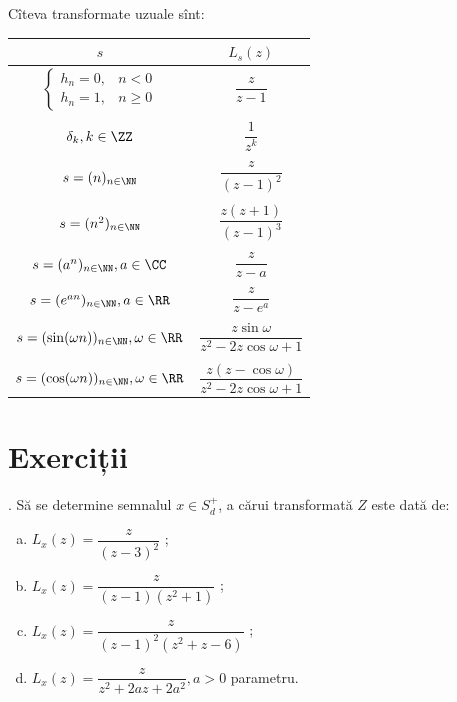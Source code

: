 Cîteva transformate uzuale sînt:
\begin{tabular}{c | c}
    $ s $ & $ L_s(z) $ \\
    \hline\hline
    $ \begin{cases}
        h_n = 0, & n < 0 \\
        h_n = 1, & n \geq 0
    \end{cases} $ & $ \dfrac{z}{z - 1} $ \\
          & \\
    $ \delta_k, k \in \ZZ $ & $ \dfrac{1}{z^k} $ \\
                            &\\
    $ s = (n)_{n \in \NN} $ & $ \dfrac{z}{(z - 1)^2} $ \\
                            &\\
    $ s = (n^2)_{n \in \NN} $ & $ \dfrac{z(z+1)}{(z - 1)^3} $ \\
                              &\\
    $ s = (a^n)_{n \in \NN}, a \in \CC $ & $ \dfrac{z}{z - a} $ \\
                                         &\\
    $ s = (e^{an})_{n \in \NN}, a \in \RR $ & $ \dfrac{z}{z - e^a} $ \\
                                            &\\
    $ s = (\sin(\omega n))_{n \in \NN}, \omega \in \RR $ & $ \dfrac{z \sin \omega}{z^2 - 2z \cos \omega + 1} $ \\
                                                         &\\
    $ s = (\cos(\omega n))_{n \in \NN}, \omega \in \RR $ & $ \dfrac{z(z - \cos \omega)}{z^2 - 2z \cos \omega + 1} $
\end{tabular}


\section{Exerciții}

\indent{}. Să se determine semnalul $x \in S_d^+$, a cărui transformată $Z$ este 
dată de:
\begin{enumerate}[(a)]
    \item $L_x (z) = \dfrac{z}{(z-3)^2}$ ;
    \item $L_x (z) = \dfrac{z}{(z-1)(z^2 + 1)}$ ;
    \item $L_x (z) = \dfrac{z}{(z-1)^2(z^2 + z - 6)}$ ;
    \item $L_x (z) = \dfrac{z}{z^2 + 2az + 2a^2}, a > 0$ parametru.
\end{enumerate}

